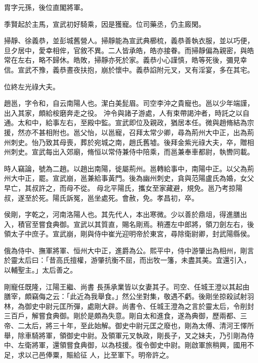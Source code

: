 \begin{pinyinscope}
 胄字元孫，後位直閣將軍。



 季賢起於主馬，宣武初好騎乘，因是獲寵。位司藥丞，仍主廄閑。



 掃靜、徐義恭，並彭城舊營人。掃靜能為宣武典櫛梳，義恭善執衣服，並以巧便，旦夕居中，愛幸相侔，官敘不異。二人皆承皓，皓亦接眷。而掃靜偏為親密，與皓常在左右，略不歸休。皓敗，掃靜亦死於家。義恭小心謹慎，皓等死後，彌見幸信。宣武不豫，義恭晝夜扶抱，崩於懷中。義恭諂附元叉，叉有淫宴，多在其宅。



 位終左光祿大夫。



 趙邕，字令和，自云南陽人也。潔白美髭眉。司空李沖之貴寵也。邕以少年端謹，出入其家，頗給桉磨奔走之役。
 沖令與諸子游處，人有束帶謁沖者，時託之以自通。太和中，給事左右，至殿中監。宣武即位及親政，猶居本任。微與趙脩結為宗援，然亦不甚相附也。邕父怡，以邕寵，召拜太常少卿，尋為荊州大中正，出為荊州刺史。怡乃致其母喪，葬於宛城之南，趙氏舊墟。後拜金紫光祿大夫，卒，贈相州刺史。宣武每出入郊廟，脩恒以常侍兼侍中陪乘，而邕兼奉車都尉，執轡同載。



 時人竊論，號為二趙。以趙出南陽，徙屬荊州。邕轉給事中，南陽中正。以父為荊州大中正，罷。宣武崩，邕兼給事黃門。後為幽州刺史，貪與范陽盧氏為婚，女父早亡，其叔許之，而母不從。
 母北平陽氏，攜女至家藏避，規免。邕乃考掠陽叔，遂至於死。陽氏訴冤，邕坐處死。會赦，免。孝昌初，卒。



 侯剛，字乾之，河南洛陽人也。其先代人，本出寒微。少以善於鼎俎，得進膳出入，積官至嘗食典御。宣武以其質直，賜名剛焉。稍遷左中郎將，領刀劍左右，後領太子中庶子。宣武崩，剛與侍中崔光迎明帝於東宮，尋除衛尉卿，封武陽縣侯。



 俄為侍中、撫軍將軍、恒州大中正，進爵為公。熙平中，侍中游肇出為相州，剛言於靈太后曰：「昔高氏擅權，游肇抗衡不屈，而出牧一籓，未盡其美。宜還引入，以輔聖主。」太后善之。



 剛寵任既隆，江陽王繼、尚書
 長孫承業皆以女妻其子。司空、任城王澄以其起由膳宰，頗竊侮之云：「此近為我舉食。」然公坐對集，敬遇不虧。後剛坐掠殺試射羽林，為御史中尉元匡所彈，處剛大辟。尚書令、任城王澄為之言於靈太后，令削封三百戶，解嘗食典御。剛於是頗為失意。剛自太和進食，遂為典御，歷兩都、三帝、二太后，將三十年，至此始解。御史中尉元匡之廢也，剛為太傅、清河王懌所舉，除車騎將軍，領御史中尉。及領軍元叉執政，剛長子，叉之妹夫，乃引剛為侍中、左衛將軍，還領嘗食典御，以為枝援。復令御史中尉。剛啟軍旅稍興，國用不足，求以己邑俸粟，賑給征
 人，比至軍下。明帝許之。




\end{pinyinscope}
